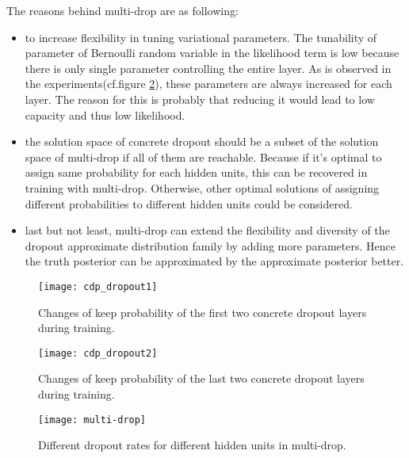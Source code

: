 The reasons behind multi-drop are as following:
\begin{itemize}
\item to increase flexibility in tuning variational parameters. The tunability of parameter of Bernoulli random variable in the likelihood term is low because there is only single parameter controlling the entire layer. As is observed in the experiments(cf.figure \ref{fig:cdp_dropout2}), these parameters are always increased for each layer. The reason for this is probably that reducing it would lead to low capacity and thus low likelihood. 

\item the solution space of concrete dropout should be a subset of the solution space of multi-drop if all of them are reachable. Because if it's optimal to assign same probability for each hidden units, this can be recovered in training with multi-drop. Otherwise, other optimal solutions of assigning different probabilities to different hidden units could be considered.

\item last but not least, multi-drop can extend the flexibility and diversity of the dropout approximate distribution family by adding more parameters. Hence the truth posterior can be approximated by the approximate posterior better.
 
\end{itemize}


\begin{figure}[H]
	\begin{center}
		\texttt{[image: cdp\_dropout1]}	
		\caption{Changes of keep probability of the first two concrete dropout layers during training.}
		\label{fig:cdp_dropout1}
	\end{center}
\end{figure}
\begin{figure}[H]
	\begin{center}
		\texttt{[image: cdp\_dropout2]}	
		\label{fig:cdp_dropout2}
		\caption{Changes of keep probability of the last two concrete dropout layers during training.}
	\end{center}
\end{figure}
\begin{figure}[H]
	\begin{center}
		\centering
		\texttt{[image: multi-drop]}
		\caption{Different dropout rates for different hidden units in multi-drop.}		
		\label{fig:multi-drop}
	\end{center}
\end{figure}


